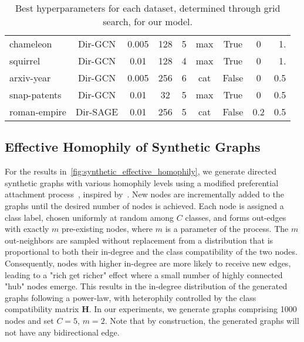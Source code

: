 \documentclass{article}
\theoremstyle{plain}
\theoremstyle{definition}
\theoremstyle{remark}
\begin{document}
\begin{table*}[t]
\begin{center}
\begin{small}
\begin{sc}
{\begin{tabular}{lcccccccr}
        \midrule
        chameleon     &  Dir-GCN    & 0.005  &     128         &    5           &  max  & True  &  0      & 1. \\
        squirrel      &  Dir-GCN    & 0.01   &     128         &    4           &  max  & True  &  0      & 1. \\
        arxiv-year    &  Dir-GCN    & 0.005  &     256         &     6          &  cat  & False &  0      & 0.5 \\
        snap-patents  &  Dir-GCN    & 0.01   &     32          &     5          &   max & True  &  0      & 0.5 \\
        roman-empire  &  Dir-SAGE   & 0.01   &     256         &     5          &   cat & False &  0.2    & 0.5 \\
        \bottomrule
    \end{tabular}
    }
\end{sc}
\end{small}
\end{center}
\caption{Best hyperparameters for each dataset, determined through grid search, for our model.}
\label{tab:best_hyperparameters}
\end{table*} 
\subsection{Effective Homophily of Synthetic Graphs}  \label{sec:effective_homophily_synthetic}
For the results in~\cref{fig:synthetic_effective_homophily}, we generate directed synthetic graphs with various homophily levels using a modified preferential attachment process~\cite{Barabasi99emergenceScaling}, inspired by~\citet{zhu2020beyond}. New nodes are incrementally added to the graphs until the desired number of nodes is achieved. Each node is assigned a class label, chosen uniformly at random among $C$ classes, and forms out-edges with exactly $m$ pre-existing nodes, where $m$ is a parameter of the process. The $m$ out-neighbors are sampled without replacement from a distribution that is proportional to both their in-degree and the class compatibility of the two nodes. Consequently, nodes with higher in-degree are more likely to receive new edges, leading to a "rich get richer" effect where a small number of highly connected "hub" nodes emerge. This results in the in-degree distribution of the generated graphs following a power-law, with heterophily controlled by the class compatibility matrix $\mathbf{H}$. In our experiments, we generate graphs comprising 1000 nodes and set $C=5$, $m=2$. Note that by construction, the generated graphs will not have any bidirectional edge.
\end{document}
